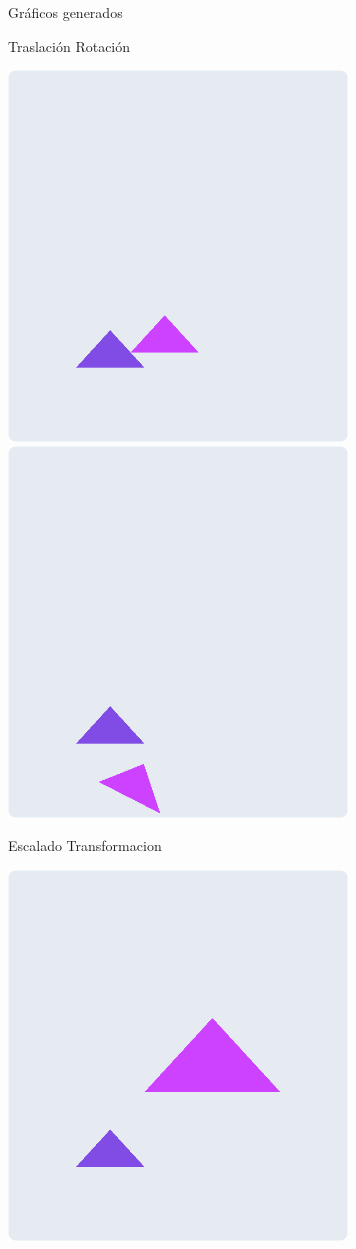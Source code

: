 \documentclass[a4paper]{article}
\begin{document}
Gráficos generados
\begin{center}
Traslación \hfil Rotación
\end{center}
\begin{center}
\includegraphics[width=9cm]{./src/traslacion.png}
\includegraphics[width=9cm]{./src/rotacion.png}\\
\begin{center}
Escalado \hfil Transformacion 
\end{center}
\includegraphics[width=9cm]{./src/escalado.png}

\end{center}
\end{document}
